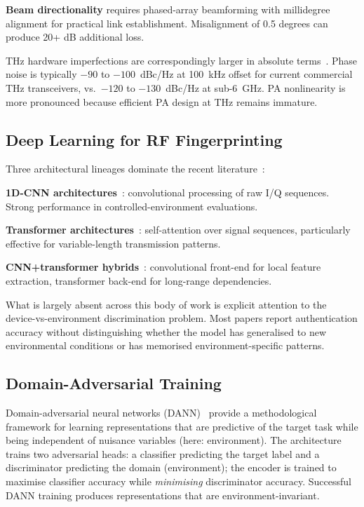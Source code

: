 \documentclass[sigconf,nonacm]{acmart}
\begin{document}
\textbf{Beam directionality} requires phased-array beamforming
with millidegree alignment for practical link establishment.
Misalignment of 0.5 degrees can produce 20+ dB additional loss.

THz hardware imperfections are correspondingly larger in absolute
terms~\cite{singh2024thzhardware}. Phase noise is typically
$-90$ to $-100$~dBc/Hz at 100~kHz offset for current commercial
THz transceivers, vs.\ $-120$ to $-130$~dBc/Hz at sub-6~GHz.
PA nonlinearity is more pronounced because efficient PA design at
THz remains immature.

\subsection{Deep Learning for RF Fingerprinting}

Three architectural lineages dominate the recent
literature~\cite{xu2024rffingersurv}:

\textbf{1D-CNN architectures}~\cite{merchant2018deep}: convolutional
processing of raw I/Q sequences. Strong performance in
controlled-environment evaluations.

\textbf{Transformer architectures}~\cite{piva2024transformerrff}:
self-attention over signal sequences, particularly effective for
variable-length transmission patterns.

\textbf{CNN+transformer hybrids}~\cite{lin2024hybridrff}: convolutional
front-end for local feature extraction, transformer back-end for
long-range dependencies.

What is largely absent across this body of work is explicit
attention to the device-vs-environment discrimination problem.
Most papers report authentication accuracy without distinguishing
whether the model has generalised to new environmental conditions
or has memorised environment-specific patterns.

\subsection{Domain-Adversarial Training}

Domain-adversarial neural networks (DANN)~\cite{ganin2016dann}
provide a methodological framework for learning representations
that are predictive of the target task while being independent of
nuisance variables (here: environment). The architecture trains
two adversarial heads: a classifier predicting the target label
and a discriminator predicting the domain (environment); the
encoder is trained to maximise classifier accuracy while
\emph{minimising} discriminator accuracy. Successful DANN training
produces representations that are environment-invariant.
\end{document}
